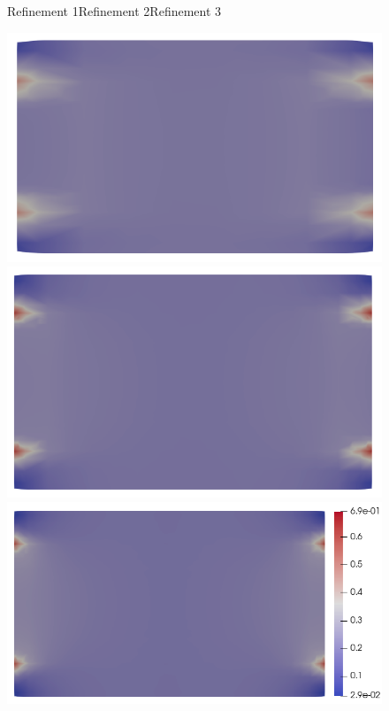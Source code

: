 \documentclass{article}
\begin{document}
\begin{figure}
    \centering
    Refinement 1\hspace{2.5cm}Refinement 2\hspace{2.5cm}Refinement 3\hspace{1cm}
    
    \includegraphics[scale=0.27]{slice_E_T-1_lambda-0_8-2-2.png}
    \includegraphics[scale=0.27]{slice_E_T-1_lambda-0_16-3-3.png}
    \includegraphics[scale=0.27]{slice_E_T-1_lambda-0_32-3-4.png}

\end{figure}
\end{document}
